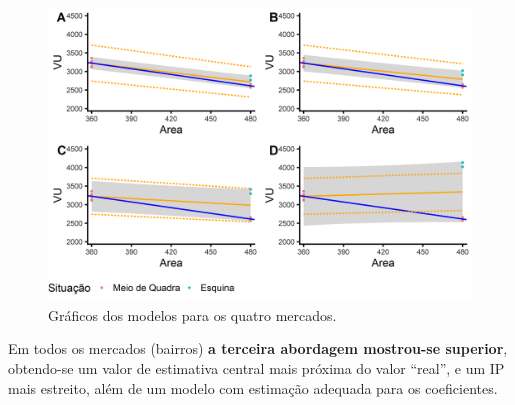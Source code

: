 \documentclass[
  a4paper, 11pt]{article}
\begin{document}
\begin{figure}[H]

{\centering \includegraphics[width=1\linewidth]{images/modelos-1} 

}

\caption{Gráficos dos modelos para os quatro mercados.}\label{fig:modelos}
\end{figure}

Em todos os mercados (bairros) \textbf{a terceira abordagem mostrou-se
superior}, obtendo-se um valor de estimativa central mais próxima do
valor ``real'', e um IP mais estreito, além de um modelo com estimação
adequada para os coeficientes.
\end{document}
